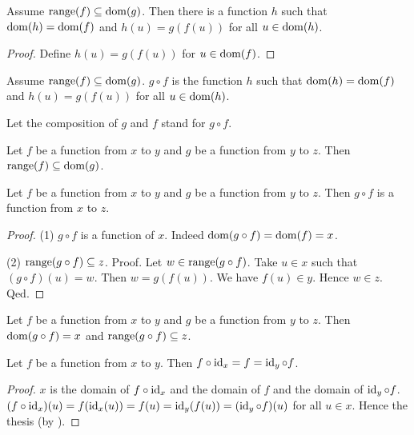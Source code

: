 \documentclass[../../set-theory.tex]{subfiles}
\begin{document}
  \begin{forthel}
    \begin{lemma}
      Assume $\operatorname{range}(f) \subseteq \operatorname{dom}(g)$.
      Then there is a function $h$ such that $\operatorname{dom}(h) = \operatorname{dom}(f)$ and $h(u) = g(f(u))$ for all $u \in \operatorname{dom}(h)$.
    \end{lemma}
    \begin{proof}
      Define $h(u) = g(f(u))$ for $u \in \operatorname{dom}(f)$.
    \end{proof}

    \begin{definition}
      Assume $\operatorname{range}(f) \subseteq \operatorname{dom}(g)$.
      $g \circ f$ is the function $h$ such that $\operatorname{dom}(h) = \operatorname{dom}(f)$ and $h(u) = g(f(u))$ for all $u \in \operatorname{dom}(h)$.
    \end{definition}

    Let the composition of $g$ and $f$ stand for $g \circ f$.

    \begin{lemma}
      Let $f$ be a function from $x$ to $y$ and $g$ be a function from $y$ to $z$.
      Then $\operatorname{range}(f) \subseteq \operatorname{dom}(g)$.
    \end{lemma}

    \begin{proposition}\label{SetTheory_02_01_289732}
      Let $f$ be a function from $x$ to $y$ and $g$ be a function from $y$ to $z$.
      Then $g \circ f$ is a function from $x$ to $z$.
    \end{proposition}
    \begin{proof}
      (1) $g \circ f$ is a function of $x$.
      Indeed $\operatorname{dom}(g \circ f) = \operatorname{dom}(f) = x$.

      (2) $\operatorname{range}(g \circ f) \subseteq z$.
      Proof.
        Let $w \in \operatorname{range}(g \circ f)$.
        Take $u \in x$ such that $(g \circ f)(u) = w$.
        Then $w = g(f(u))$.
        We have $f(u) \in y$.
        Hence $w \in z$.
      Qed.
    \end{proof}

    \begin{lemma}
      Let $f$ be a function from $x$ to $y$ and $g$ be a function from $y$ to $z$.
      Then $\operatorname{dom}(g \circ f) = x$ and $\operatorname{range}(g \circ f) \subseteq z$.
    \end{lemma}

    \begin{proposition}\label{SetTheory_02_01_718601}
      Let $f$ be a function from $x$ to $y$.
      Then $f \circ \operatorname{id}_{x} = f = \operatorname{id}_{y} \circ f$.
    \end{proposition}
    \begin{proof}
      $x$ is the domain of $f \circ \operatorname{id}_{x}$ and the domain of $f$ and the domain of $\operatorname{id}_{y} \circ f$.
      $(f \circ \operatorname{id}_{x})(u) = f(\operatorname{id}_{x}(u)) = f(u) = \operatorname{id}_{y}(f(u)) = (\operatorname{id}_{y} \circ f)(u)$ for all $u \in x$.
      Hence the thesis (by ).
    \end{proof}


\end{forthel}
\end{document}

